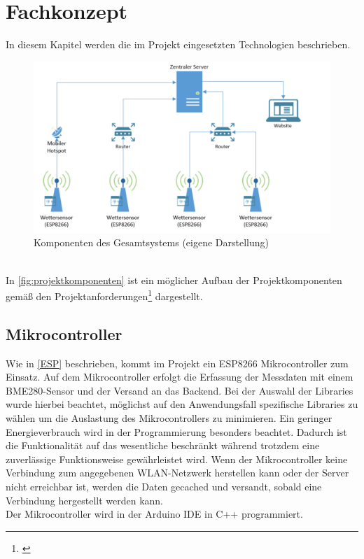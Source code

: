 \section{Fachkonzept}
In diesem Kapitel werden die im Projekt eingesetzten Technologien beschrieben.\\
\begin{figure}[h]
    \centering
    \includegraphics[width=0.7\linewidth]{img/projektkomponenten}
    \caption[Komponenten des Gesamtsystems]{Komponenten des Gesamtsystems (eigene Darstellung)}
    \label{fig:projektkomponenten}
\end{figure}
\\
In \autoref{fig:projektkomponenten} ist ein möglicher Aufbau der Projektkomponenten gemäß den Projektanforderungen\footnote{\cite{Wortmann.2020}} dargestellt.

\subsection{Mikrocontroller}
Wie in \autoref{ESP} beschrieben, kommt im Projekt ein ESP8266 Mikrocontroller zum Einsatz. Auf dem Mikrocontroller erfolgt die Erfassung der Messdaten mit einem BME280-Sensor und der Versand an das Backend.
Bei der Auswahl der Libraries wurde hierbei beachtet, möglichst auf den Anwendungsfall spezifische Libraries zu wählen um die Auslastung des Mikrocontrollers zu minimieren.
Ein geringer Energieverbrauch wird in der Programmierung besonders beachtet. Dadurch ist die Funktionalität auf das wesentliche beschränkt während trotzdem eine zuverlässige Funktionsweise gewährleistet wird. Wenn der Mikrocontroller keine Verbindung zum angegebenen WLAN-Netzwerk herstellen kann oder der Server nicht erreichbar ist, werden die Daten gecached und versandt, sobald eine Verbindung hergestellt werden kann.\\
Der Mikrocontroller wird in der Arduino IDE in C++ programmiert.

